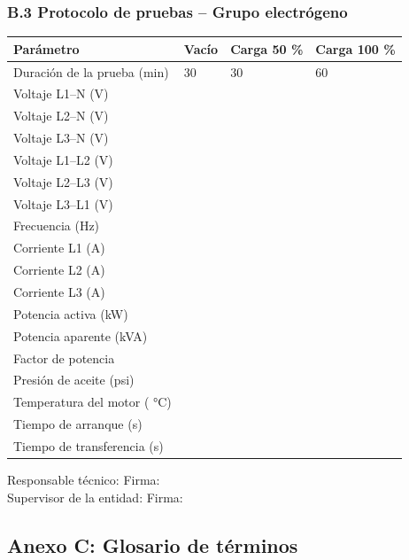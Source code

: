 \documentclass[12pt,a4paper]{article}
\begin{document}
\subsubsection{B.3 Protocolo de pruebas -- Grupo electrógeno}

\begin{center}
\begin{tabular}{L{5.5cm}L{2.5cm}L{2.5cm}L{2.5cm}}
\toprule
\textbf{Parámetro} & \textbf{Vacío} & \textbf{Carga 50 \%} & \textbf{Carga 100 \%} \\
\midrule
Duración de la prueba (min) & 30 & 30 & 60 \\
Voltaje L1--N (V) & & & \\
Voltaje L2--N (V) & & & \\
Voltaje L3--N (V) & & & \\
Voltaje L1--L2 (V) & & & \\
Voltaje L2--L3 (V) & & & \\
Voltaje L3--L1 (V) & & & \\
Frecuencia (Hz) & & & \\
Corriente L1 (A) & & & \\
Corriente L2 (A) & & & \\
Corriente L3 (A) & & & \\
Potencia activa (kW) & & & \\
Potencia aparente (kVA) & & & \\
Factor de potencia & & & \\
Presión de aceite (psi) & & & \\
Temperatura del motor ( °C) & & & \\
Tiempo de arranque (s) & & & \\
Tiempo de transferencia (s) & & & \\
\bottomrule
\end{tabular}
\end{center}

\vspace{0.5cm}
\noindent
Responsable técnico: \hrulefill \hspace{1cm} Firma: \hrulefill \\
Supervisor de la entidad: \hrulefill \hspace{1cm} Firma: \hrulefill

\subsection{Anexo C: Glosario de términos}
\end{document}
